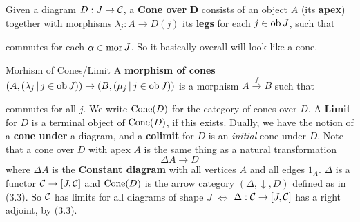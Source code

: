 \documentclass{article}
\begin{document}
\begin{fancydefine}
    Given a diagram $D : J \to \mathcal{C}$, a \textbf{Cone over} $\mathbf{D}$ consists of an object $A$ (its \textbf{apex}) together with morphisms $\lambda_{j} : A \to D(j)$ its \textbf{legs} for each $j \in \operatorname{ob} J$, such that \begin{center}
    \end{center}
    commutes for each $\alpha \in \operatorname{mor} J$. So it basically overall will look like a cone.
    \gap
    \begin{define*}{Morhism of Cones/Limit}
    A \textbf{morphism of cones} $(A, (\lambda_{j} \, | \, j \in \operatorname{ob} J)) \to (B, (\mu_{j} \, | \, j \in \operatorname{ob} J))$ is a morphism $A \xrightarrow{f} B$ such that \begin{center} 
    \end{center} commutes for all $j$. We write $\operatorname{Cone} (D)$ for the category of cones over $D$. A \textbf{Limit} for $D$ is a terminal object of $\operatorname{Cone} (D)$, if this exists. Dually, we have the notion of a \textbf{cone under} a diagram, and a \textbf{colimit} for $D$ is an \textit{initial} cone under $D$.\gap 
    Note that a cone over $D$ with apex $A$ is the same thing as a natural transformation \[ \Delta A \to D \] where $\Delta A$ is the \textbf{Constant diagram} with all vertices $A$ and all edges $1_{A}$. \gap 
    $\Delta$ is a functor $\mathcal{C} \to [J,\mathcal{C}]$ and $\operatorname{Cone} (D)$ is the arrow category $(\Delta, \downarrow, D)$ defined as in (3.3). \gap 
    So $\mathcal{C}$ has limits for all diagrams of shape $J$ $\Leftrightarrow$ $\Delta : \mathcal{C} \to [J, \mathcal{C}]$ has a right adjoint, by (3.3).
\end{define*}
\end{fancydefine}
\end{document}

